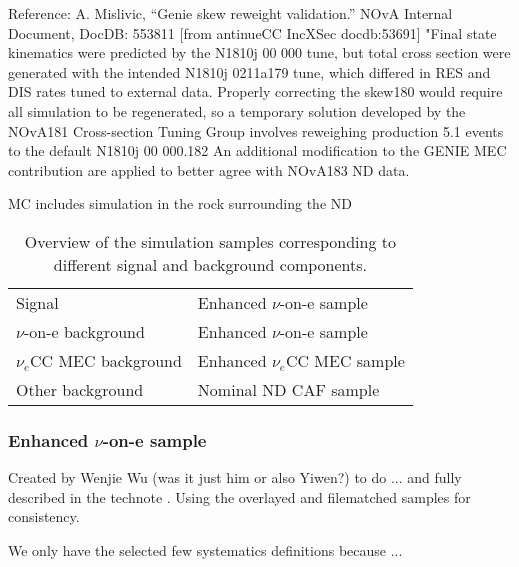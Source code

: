 Reference: A. Mislivic, “Genie skew reweight validation.” NOvA Internal Document, DocDB: 553811
[from antinueCC IncXSec docdb:53691]
"Final state kinematics were predicted by the N1810j 00 000 tune, but total cross section were generated with the intended N1810j 0211a179 tune, which differed in RES and DIS rates tuned to external data. Properly correcting the skew180 would require all simulation to be regenerated, so a temporary solution developed by the NOvA181 Cross-section Tuning Group involves reweighing production 5.1 events to the default N1810j 00 000.182 An additional modification to the GENIE MEC contribution are applied to better agree with NOvA183 ND data.

MC includes simulation in the rock surrounding the ND



\begin{table}[!ht]
\centering
\caption{Overview of the simulation samples corresponding to different signal and background components.}
\def\arraystretch{1.4}
\begin{tabular}{l@{\hskip 1in}l}
Signal                   & Enhanced $\nu$-on-e sample\\
$\nu$-on-e background    & Enhanced $\nu$-on-e sample\\
$\nu_e$CC MEC background & Enhanced $\nu_e$CC MEC sample\\
Other background         & Nominal ND CAF sample
\end{tabular}
\label{tab:DefinitionsOverview}
\end{table}

\subsubsection*{Enhanced $\nu$-on-e sample}
Created by Wenjie Wu (was it just him or also Yiwen?) to do ... and fully described in the technote \cite{NOVA-doc-56383}. Using the overlayed and filematched samples for consistency.

We only have the selected few systematics definitions because ... 

